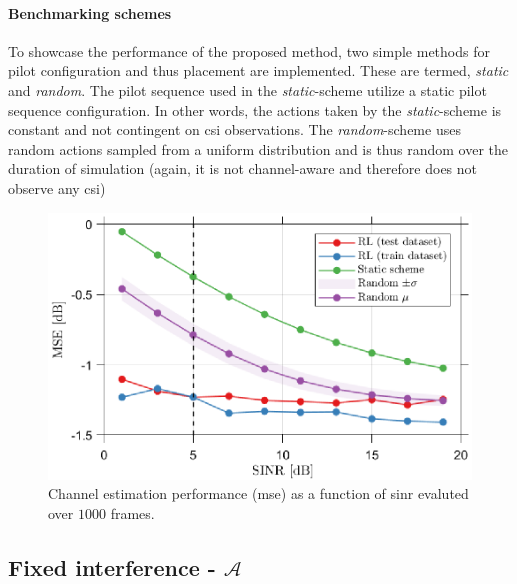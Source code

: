 \paragraph{Benchmarking schemes}
To showcase the performance of the proposed method, two simple methods for pilot configuration and thus placement are implemented. These are termed, \emph{static} and \emph{random}. The pilot sequence used in the \emph{static}-scheme utilize a static pilot sequence configuration. In other words, the actions taken by the \emph{static}-scheme is constant and not contingent on \gls{csi} observations. The \emph{random}-scheme uses random actions sampled from a uniform distribution and is thus random over the duration of simulation (again, it is not channel-aware and therefore does not observe any \gls{csi}) 
 \begin{figure}
    \centering
    \includegraphics{chapters/part_uplink/figures/results/SINR_sweep.eps}
    \caption{Channel estimation performance (\gls{mse}) as a function of \gls{sinr} evaluted over $1000$ frames.}
    \label{fig:RL_sinr_sweep}
\end{figure}

\subsection{Fixed interference -  $\mathcal{A}$}\label{subsec:RL_results_A}

